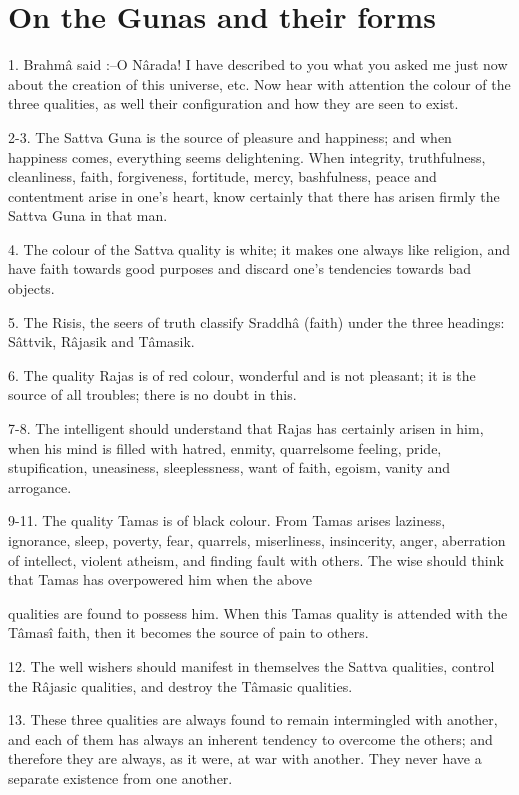 ﻿\chapter{On the Gunas and their forms}

1. Brahm\^a said :--O N\^arada! I have described to you what you asked me just now about the creation of this universe, etc. Now hear with attention the colour of the three qualities, as well their configuration and how they are seen to exist.

2-3. The Sattva Guna is the source of pleasure and happiness; and when happiness comes, everything seems delightening. When integrity, truthfulness, cleanliness, faith, forgiveness, fortitude, mercy, bashfulness, peace and contentment arise in one's heart, know certainly that there has arisen firmly the Sattva Guna in that man.

4. The colour of the Sattva quality is white; it makes one always like religion, and have faith towards good purposes and discard one's tendencies towards bad objects.

5. The Risis, the seers of truth classify Sraddh\^a (faith) under the three headings: S\^attvik, R\^ajasik and T\^amasik.

6. The quality Rajas is of red colour, wonderful and is not pleasant; it is the source of all troubles; there is no doubt in this.

7-8. The intelligent should understand that Rajas has certainly arisen in him, when his mind is filled with hatred, enmity, quarrelsome feeling, pride, stupification, uneasiness, sleeplessness, want of faith, egoism, vanity and arrogance.

9-11. The quality Tamas is of black colour. From Tamas arises laziness, ignorance, sleep, poverty, fear, quarrels, miserliness, insincerity, anger, aberration of intellect, violent atheism, and finding fault with others. The wise should think that Tamas has overpowered him when the above

qualities are found to possess him. When this Tamas quality is attended with the T\^amas\^i faith, then it becomes the source of pain to others.

12. The well wishers should manifest in themselves the Sattva qualities, control the R\^ajasic qualities, and destroy the T\^amasic qualities.

13. These three qualities are always found to remain intermingled with another, and each of them has always an inherent tendency to overcome the others; and therefore they are always, as it were, at war with another. They never have a separate existence from one another.

